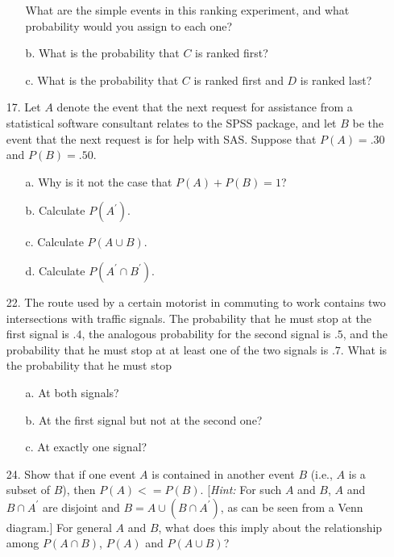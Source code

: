 \documentclass[letterpaper,12pt]{article}
\begin{document}
\begin{enumerate}
\begin{enumerate}
        What are the simple events in this ranking experiment, and what probability would you assign to each one?
      \item[b.]
        What is the probability that $C$ is ranked first?
      \item[c.]
        What is the probability that $C$ is ranked first and $D$ is ranked last?
    \end{enumerate}
  \item[17.]
  Let $A$ denote the event that the next request for assistance from a statistical software consultant relates to the SPSS package, and let $B$ be the event that the next request is for help with SAS. Suppose that $P(A) = .30$ and $P(B) = .50$.
  \begin{enumerate}
      \item[a.]
        Why is it not the case that $P(A) + P(B) = 1$?
      \item[b.]
        Calculate $P(A^\prime)$.
      \item[c.]
        Calculate $P(A\cup B)$.
      \item[d.]
        Calculate $P(A^\prime \cap B^\prime)$.
    \end{enumerate}
  \item[22.]
    The route used by a certain motorist in commuting to work contains two intersections with traffic signals. The probability that he must stop at the first signal is $.4$, the analogous probability for the second signal is $.5$, and the probability that he must stop at at least one of the two signals is $.7$. What is the probability that he must stop
  \begin{enumerate}
      \item[a.]
        At both signals?
      \item[b.]
        At the first signal but not at the second one?
      \item[c.]
        At exactly one signal?
    \end{enumerate}
  \item[24.]
    Show that if one event $A$ is contained in another event $B$ (i.e., $A$ is a subset of $B$), then $P(A) <= P(B)$. [\textit{Hint:} For such $A$ and $B$, $A$ and $B \cap A^\prime$ are disjoint and $B = A \cup (B \cap A^\prime)$, as can be seen from a Venn diagram.] For general $A$ and $B$, what does this imply about the relationship among $P(A \cap B)$, $P(A)$ and $P(A \cup B)$?
\end{enumerate}
\end{document}
